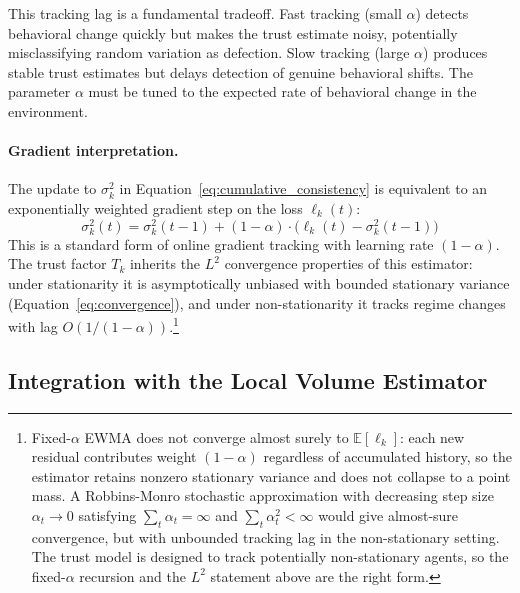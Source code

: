 This tracking lag is a fundamental tradeoff. Fast tracking (small $\alpha$) detects behavioral change quickly but makes the trust estimate noisy, potentially misclassifying random variation as defection. Slow tracking (large $\alpha$) produces stable trust estimates but delays detection of genuine behavioral shifts. The parameter $\alpha$ must be tuned to the expected rate of behavioral change in the environment.

\paragraph{Gradient interpretation.} The update to $\sigma_k^2$ in Equation~\eqref{eq:cumulative_consistency} is equivalent to an exponentially weighted gradient step on the loss $\ell_k(t)$:
\begin{equation}
\label{eq:gradient_step}
\sigma_k^2(t) = \sigma_k^2(t-1) + (1 - \alpha) \cdot \bigl(\ell_k(t) - \sigma_k^2(t-1)\bigr)
\end{equation}
This is a standard form of online gradient tracking with learning rate $(1 - \alpha)$. The trust factor $T_k$ inherits the $L^2$ convergence properties of this estimator: under stationarity it is asymptotically unbiased with bounded stationary variance (Equation~\ref{eq:convergence}), and under non-stationarity it tracks regime changes with lag $O(1/(1-\alpha))$.\footnote{Fixed-$\alpha$ EWMA does not converge almost surely to $\mathbb{E}[\ell_k]$: each new residual contributes weight $(1 - \alpha)$ regardless of accumulated history, so the estimator retains nonzero stationary variance and does not collapse to a point mass. A Robbins-Monro stochastic approximation with decreasing step size $\alpha_t \to 0$ satisfying $\sum_t \alpha_t = \infty$ and $\sum_t \alpha_t^2 < \infty$ \citep{robbins1951stochastic} would give almost-sure convergence, but with unbounded tracking lag in the non-stationary setting. The trust model is designed to track potentially non-stationary agents, so the fixed-$\alpha$ recursion and the $L^2$ statement above are the right form.}


\subsection{Integration with the Local Volume Estimator}
\label{app:trust_estimator_integration}

